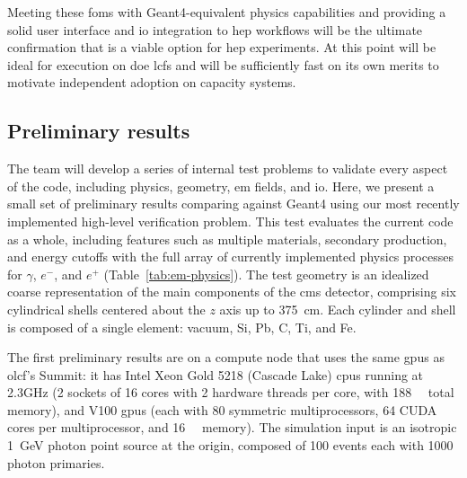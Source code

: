 Meeting these \acp{fom} with Geant4-equivalent physics capabilities and
providing a solid user interface and \ac{io} integration to \ac{hep} workflows
will be the ultimate confirmation that \celeritas is a viable option for
\ac{hep} experiments. At this point \celeritas will be ideal for execution on
\ac{doe} \acp{lcf} and will be sufficiently fast on its own merits to motivate
independent adoption on capacity systems.

\subsection{Preliminary results}

The \celeritas team will develop a series of internal test problems to validate
every aspect of the code, including physics, geometry, \ac{em} fields, and
\ac{io}. Here, we present a small set of preliminary results comparing
\celeritas against Geant4 using our most recently implemented high-level
verification problem. This test evaluates the current code as a whole, including
features such as multiple materials, secondary production, and energy cutoffs
with the full array of currently implemented physics processes for $\gamma$,
$e^-$, and $e^+$ (Table~\ref{tab:em-physics}). The test geometry is an idealized
coarse representation of the main components of the \ac{cms} detector,
comprising six cylindrical shells centered about the $z$ axis up to
\SI{375}{\centi\meter}. Each cylinder and shell is composed of a single element:
vacuum, Si, Pb, C, Ti, and Fe.

The first preliminary results are on a compute node that uses the same \acp{gpu}
as \ac{olcf}'s Summit: it has Intel Xeon Gold 5218 (Cascade Lake) \acp{cpu}
running at 2.3GHz (2 sockets of 16 cores with 2 hardware threads per core, with
\SI{188}{\giga\byte} total memory), and \nvidia V100 \acp{gpu} (each with 80
symmetric multiprocessors, 64 CUDA cores per multiprocessor, and
\SI{16}{\giga\byte} memory). The simulation input is an isotropic
\SI{1}{\giga\electronvolt} photon point source at the origin, composed of 100
events each with \num{1000} photon primaries.

